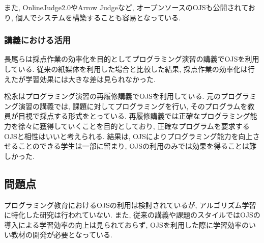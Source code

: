 また, OnlineJudge2.0\cite{OnlineJudge2.0}やArrow Judge\cite{Arrow Judge}など, オープンソースのOJSも公開されており, 個人でシステムを構築することも容易となっている. 


\subsubsection{講義における活用}

長尾ら\cite{nagao2016}は採点作業の効率化を目的としてプログラミング演習の講義でOJSを利用している. 
従来の紙媒体を利用した場合と比較した結果, 採点作業の効率化は行えたが学習効果には大きな差は見られなかった. 

松永\cite{matsunaga2011}はプログラミング演習の再履修講義でOJSを利用している. 
元のプログラミング演習の講義では, 課題に対してプログラミングを行い, そのプログラムを教員が目視で採点する形式をとっている. 
再履修講義では正確なプログラミング能力を徐々に獲得していくことを目的としており, 正確なプログラムを要求するOJSと相性はいいと考えられる. 
結果は, OJSによりプログラミング能力を向上させることのできる学生は一部に留まり, OJSの利用のみでは効果を得ることは難しかった. 


\subsection{問題点}

プログラミング教育におけるOJSの利用は検討されているが, アルゴリズム学習に特化した研究は行われていない. 
また, 従来の講義や課題のスタイルではOJSの導入による学習効率の向上は見られておらず, OJSを利用した際に学習効率のいい教材の開発が必要となっている. 







